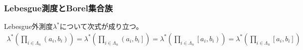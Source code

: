 \documentclass[dvipdfmx]{jsarticle}
\begin{document}
\subsubsection{Lebesgue測度とBorel集合族}%
\begin{thm}\label{4.5.4.9}
Lebesgue外測度$\lambda^{*}$について次式が成り立つ。
\begin{align*}
\lambda^{*}\left( \prod_{i \in \varLambda_{n}} \left( a_{i},b_{i} \right) \right) = \lambda^{*}\left( \prod_{i \in \varLambda_{n}} \left( a_{i},b_{i} \right] \right) = \lambda^{*}\left( \prod_{i \in \varLambda_{n}} \left[ a_{i},b_{i} \right) \right) = \lambda^{*}\left( \prod_{i \in \varLambda_{n}} \left[ a_{i},b_{i} \right] \right)
\end{align*}
\end{thm}
\end{document}
